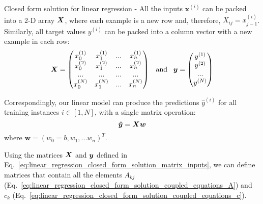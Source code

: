 \begin{frame}[t,allowframebreaks]{Closed form solution for linear regression -}
    All the inputs $\mathbf{x}^{(i)}$ can be packed into a 2-D array $\boldsymbol{X}$,
    where each example is a new row and, therefore, $X_{ij} = x_{j-1}^{(i)}$.
    Similarly, all target values $y^{(i)}$ can be packed into a column vector 
    with a new example in each row:\\
    \vspace{-0.2cm}
    \begin{equation}
        \boldsymbol{X} =
        \begin{pmatrix}
            x_0^{(1)} &  x_1^{(1)} & ... & x_n^{(1)} \\
            x_0^{(2)} &  x_1^{(2)} & ... & x_n^{(2)} \\
            ...       &  ...       & ... & ...       \\
            x_0^{(N)} &  x_1^{(N)} & ... & x_n^{(N)} \\
        \end{pmatrix} 
        \;\;\; \textrm{and} \;\;\;
        \boldsymbol{y} =
        \begin{pmatrix}
            y^{(1)} \\
            y^{(2)} \\
            ...     \\
            y^{(N)} \\
        \end{pmatrix} 
        \label{eq:linear_regression_closed_form_solution_matrix_inputs}
    \end{equation}

    Correspondingly, our linear model can produce the predictions $\hat{y}^{(i)}$ 
    for all training instances $i \in [1,N]$, with a single matrix operation:\\
    \vspace{-0.3cm}
    \begin{equation}
        \boldsymbol{\hat{y}} = \boldsymbol{X}{\boldsymbol{w}}
        \label{eq:linear_regression_closed_form_solution_matrix_output}
    \end{equation}
    \vspace{-0.2cm}
    where $\mathbf{w}=(w_0=b, w_1,...w_{n})^T$.\\

    \framebreak


    Using the matrices $\boldsymbol{X}$ and $\boldsymbol{y}$ defined in 
    Eq.~\ref{eq:linear_regression_closed_form_solution_matrix_inputs},
    we can define matrices that contain all the elements 
    $A_{kj}$ (Eq.~\ref{eq:linear_regression_closed_form_solution_coupled_equations_A}) and
    $c_{k}$ (Eq.~\ref{eq:linear_regression_closed_form_solution_coupled_equations_c}).


\end{frame}
